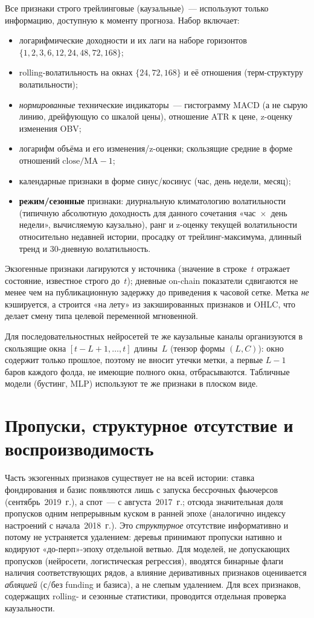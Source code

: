 \documentclass[12pt,a4paper]{report}
\begin{document}
Все признаки строго трейлинговые (каузальные)~--- используют только информацию,
доступную к моменту прогноза. Набор включает:
\begin{itemize}[leftmargin=*]
  \item логарифмические доходности и их лаги на наборе горизонтов
        $\{1,2,3,6,12,24,48,72,168\}$;
  \item rolling-волатильность на окнах $\{24,72,168\}$ и её отношения (терм-структуру
        волатильности);
  \item \emph{нормированные} технические индикаторы~--- гистограмму MACD (а не сырую
        линию, дрейфующую со шкалой цены), отношение ATR к цене, z-оценку изменения
        OBV;
  \item логарифм объёма и его изменения/z-оценки; скользящие средние в форме
        отношений $\mathrm{close}/\mathrm{MA}-1$;
  \item календарные признаки в форме синус/косинус (час, день недели, месяц);
  \item \textbf{режим/сезонные} признаки: диурнальную климатологию волатильности
        (типичную абсолютную доходность для данного сочетания «час~$\times$~день
        недели», вычисляемую каузально), ранг и z-оценку текущей волатильности
        относительно недавней истории, просадку от трейлинг-максимума, длинный
        тренд и 30-дневную волатильность.
\end{itemize}
Экзогенные признаки лагируются у источника (значение в строке~$t$ отражает состояние,
известное строго до~$t$); дневные on-chain показатели сдвигаются не менее чем на
публикационную задержку до приведения к часовой сетке. Метка \emph{не} кэшируется, а
строится «на лету» из закэшированных признаков и OHLC, что делает смену типа целевой
переменной мгновенной.

Для последовательностных нейросетей те же каузальные каналы организуются в скользящие
окна $[t-L+1,\dots,t]$ длины~$L$ (тензор формы $(L,C)$): окно содержит только прошлое,
поэтому не вносит утечки метки, а первые $L-1$ баров каждого фолда, не имеющие полного
окна, отбрасываются. Табличные модели (бустинг, MLP) используют те же признаки в
плоском виде.

\section{Пропуски, структурное отсутствие и воспроизводимость}

Часть экзогенных признаков существует не на всей истории: ставка фондирования и
базис появляются лишь с запуска бессрочных фьючерсов (сентябрь~2019~г.), а спот~---
с августа~2017~г.; отсюда значительная доля пропусков одним непрерывным куском в
ранней эпохе (аналогично индексу настроений с начала~2018~г.). Это \emph{структурное}
отсутствие информативно и потому не устраняется удалением: деревья принимают
пропуски нативно и кодируют «до-перп»-эпоху отдельной ветвью. Для моделей, не
допускающих пропусков (нейросети, логистическая регрессия), вводятся бинарные флаги
наличия соответствующих рядов, а влияние деривативных признаков оценивается
\emph{абляцией} (с/без funding и базиса), а не слепым удалением. Для всех признаков,
содержащих rolling- и сезонные статистики, проводится отдельная проверка
каузальности.
\end{document}
